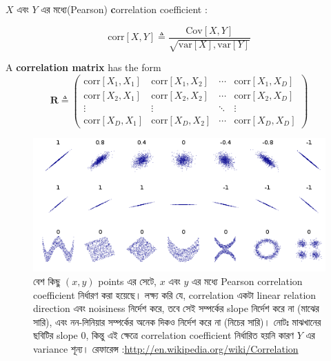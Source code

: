 \documentclass[graybox, envcountchap, twocolumn]{styles/svmult}
\begin{document}
\begin{definition}
{\bengalifont  $X$ এবং $Y$ এর মধ্যে(Pearson) {\textbf correlation coefficient} :}

\begin{equation}
\text{corr}[X,Y] \triangleq \dfrac{\text{Cov}[X,Y]}{\sqrt{\text{var}[X],\text{var}[Y]}}
\end{equation}
\end{definition}

A \textbf{correlation matrix} has the form
\begin{equation}
\mathbf{R} \triangleq \left( \begin{array}{cccc}
           \text{corr}[X_1,X_1] & \text{corr}[X_1,X_2] & \cdots & \text{corr}[X_1,X_D] \\
           \text{corr}[X_2,X_1] & \text{corr}[X_2,X_2] & \cdots & \text{corr}[X_2,X_D] \\
		   \vdots & \vdots & \ddots & \vdots \\
           \text{corr}[X_D,X_1] & \text{corr}[X_D,X_2] & \cdots & \text{corr}[X_D,X_D] \end{array} \right)
\end{equation}

\begin{figure}[hbtp]
\centering
    \includegraphics[scale=.80]{Correlation-examples.png}
\caption{ {\bengalifont বেশ কিছু $(x, y)$ points এর সেটে, $x$ এবং $y$ এর মধ্যে Pearson correlation coefficient নির্ধারণ করা হয়েছে। লক্ষ্য করি যে, correlation একটা linear  relation direction এবং noisiness নির্দেশ করে, তবে সেই সম্পর্কের slope নির্দেশ করে না (মাঝের সারি), এবং নন-লিনিয়ার সম্পর্কের অনেক দিকও নির্দেশ করে না (নিচের সারি)। নোটঃ মাঝখানের ছবিটির slope 0, কিন্তু এই ক্ষেত্রে correlation coefficient নির্ধারিত হয়নি কারণ $Y$ এর variance শূন্য। রেফারেন্স :\url{http://en.wikipedia.org/wiki/Correlation}}}

\label{fig:Correlation-examples} 
\end{figure}
\end{document}
